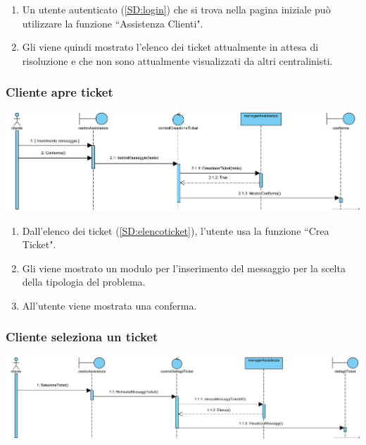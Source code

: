 \documentclass[12pt]{article}
\begin{document}
\begin{enumerate}
\item Un utente autenticato (\ref{SD:login}) che si trova nella pagina iniziale può utilizzare la funzione ``Assistenza Clienti".
\item Gli viene quindi mostrato l'elenco dei ticket attualmente in attesa di risoluzione e che non sono attualmente visualizzati da altri centralinisti.
\end{enumerate}

\subsubsection{Cliente apre ticket}
\label{SD:aperturaticket}

\begin{center}
\includegraphics[clip,width=\textwidth]{SequenceDiagram/ClienteTicketCreazione}
\end{center}

\begin{enumerate}
\item Dall'elenco dei ticket (\ref{SD:elencoticket}), l'utente usa la funzione ``Crea Ticket".
\item Gli viene mostrato un modulo per l'inserimento del messaggio per la scelta della tipologia del problema.
\item All'utente viene mostrata una conferma.
\end{enumerate}

\newpage

\subsubsection{Cliente seleziona un ticket}
\label{SD:selezioneticketcliente}

\begin{center}
\includegraphics[width=\textwidth]{SequenceDiagram/ClienteTicketSeleziona}
\end{center}
\end{document}
